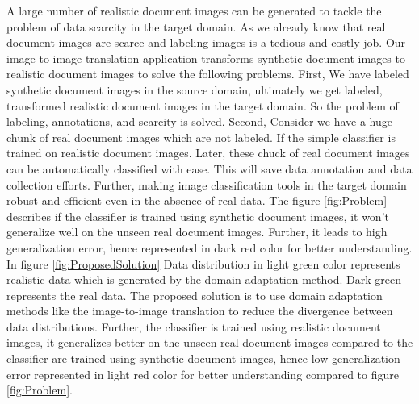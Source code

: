 A large number of realistic document images can be generated to tackle the problem of data scarcity in the target domain. As we already know that real document images are scarce and labeling images is a tedious and costly job. Our image-to-image translation application transforms synthetic document images to realistic document images to solve the following problems. First, We have labeled synthetic document images in the source domain, ultimately we get labeled, transformed realistic document images in the target domain. So the problem of labeling, annotations, and scarcity is solved. Second, Consider we have a huge chunk of real document images which are not labeled. If the simple classifier is trained on realistic document images. Later, these chuck of real document images can be automatically classified with ease. This will save data annotation and data collection efforts. Further, making image classification tools in the target domain robust and efficient even in the absence of real data. The figure \ref{fig:Problem} describes if the classifier is trained using synthetic document images, it won't generalize well on the unseen real document images. Further, it leads to high generalization error, hence represented in dark red color for better understanding. In figure \ref{fig:ProposedSolution} Data distribution in light green color represents realistic data which is generated by the domain adaptation method. Dark green represents the real data. The proposed solution is to use domain adaptation methods like the image-to-image translation to reduce the divergence between data distributions. Further, the classifier is trained using realistic document images, it generalizes better on the unseen real document images compared to the classifier are trained using synthetic document images, hence low generalization error represented in light red color for better understanding compared to figure \ref{fig:Problem}.


